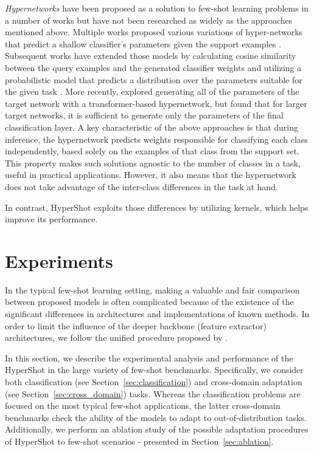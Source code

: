 \documentclass[nohyperref]{article}
\def\our{HyperShot}
\theoremstyle{plain}
\theoremstyle{definition}
\theoremstyle{remark}
\begin{document}
{\em Hypernetworks} \cite{ha2016hypernetworks} have been proposed as a solution to few-shot learning problems in a number of works but have not been researched as widely as the approaches mentioned above. Multiple works proposed various variations of hyper-networks that predict a shallow classifier's parameters given the support examples \cite{bauer2017discriminative,qiao2017fewshot}. Subsequent works have extended those models by calculating cosine similarity between the query examples and the generated classifier weights \cite{gidaris2018dynamic} and utilizing a probabilistic model that predicts a distribution over the parameters suitable for the given task \cite{gordon2018meta}. More recently, \cite{zhmoginov2022hypertransformer} explored generating all of the parameters of the target network with a transformer-based hypernetwork, but found that for larger target networks, it is sufficient to generate only the parameters of the final classification layer.
A key characteristic of the above approaches is that during inference, the hypernetwork predicts weights responsible for classifying each class independently, based solely on the examples of that class from the support set. This property makes such solutions agnostic to the number of classes in a task, useful in practical applications. However, it also means that the hypernetwork does not take advantage of the inter-class differences in the task at hand.  

In contrast, \our{} exploits those differences by utilizing kernels, which helps improve its performance.






\section{Experiments}




In the typical few-shot learning setting, making a valuable and fair comparison between proposed models is often complicated because of the existence of the significant differences in architectures and implementations of known methods. In order to limit the influence of the deeper backbone (feature extractor) architectures, we follow the unified procedure proposed by \cite{chen2019closer}.

In this section, we describe the experimental analysis and performance of the \our{} in the large variety of few-shot benchmarks. Specifically, we consider both classification (see Section~\ref{sec:classification}) and cross-domain adaptation (see Section~\ref{sec:cross_domain}) tasks. Whereas the classification problems are focused on the most typical few-shot applications, the latter cross-domain benchmarks check the ability of the models to adapt to out-of-distribution tasks.
Additionally, we perform an ablation study of the possible adaptation procedures of \our{} to few-shot scenarios - presented in Section~\ref{sec:ablation}.
\end{document}
